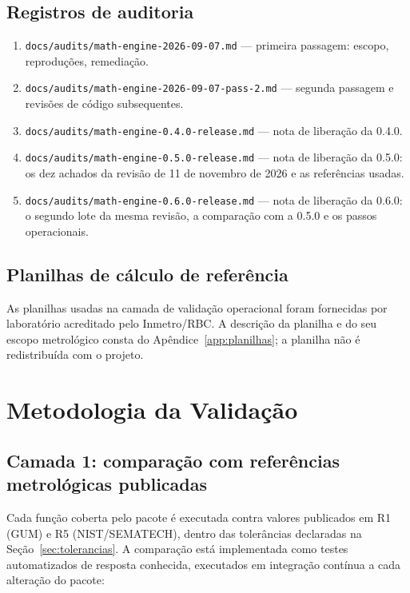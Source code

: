 \documentclass[11pt,a4paper]{article}
\newcommand{\docVersion}{0.6.0}
\newcommand{\previousVersion}{0.5.0}
\newcommand{\reviewDate}{11 de novembro de 2026}
\begin{document}
\subsection{Registros de auditoria}

\begin{enumerate}[label=A\arabic*., leftmargin=2.6em]
  \item \texttt{docs/audits/math-engine-2026-09-07.md} --- primeira passagem: escopo, reproduções, remediação.
  \item \texttt{docs/audits/math-engine-2026-09-07-pass-2.md} --- segunda passagem e revisões de código subsequentes.
  \item \texttt{docs/audits/math-engine-0.4.0-release.md} --- nota de liberação da 0.4.0.
  \item \texttt{docs/audits/math-engine-0.5.0-release.md} --- nota de liberação da \previousVersion{}: os dez achados da revisão de \reviewDate{} e as referências usadas.
  \item \texttt{docs/audits/math-engine-0.6.0-release.md} --- nota de liberação da \docVersion{}: o segundo lote da mesma revisão, a comparação com a \previousVersion{} e os passos operacionais.
\end{enumerate}

\subsection{Planilhas de cálculo de referência}

As planilhas usadas na camada de validação operacional foram fornecidas por laboratório acreditado pelo Inmetro/RBC. A descrição da planilha e do seu escopo metrológico consta do Apêndice~\ref{app:planilhas}; a planilha não é redistribuída com o projeto.

\section{Metodologia da Validação}
\label{sec:metodologia}

\subsection{Camada 1: comparação com referências metrológicas publicadas}

Cada função coberta pelo pacote é executada contra valores publicados em R1 (GUM) e R5 (NIST/SEMATECH), dentro das tolerâncias declaradas na Seção~\ref{sec:tolerancias}. A comparação está implementada como testes automatizados de resposta conhecida, executados em integração contínua a cada alteração do pacote:
\end{document}
